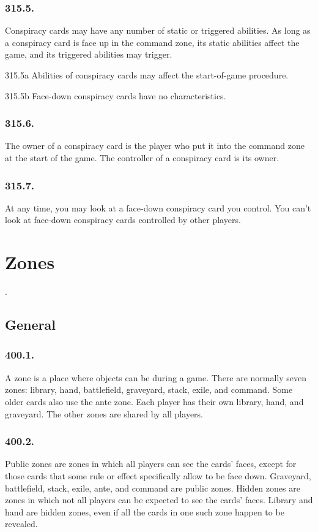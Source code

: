 \subsection*{315.5.}
Conspiracy cards may have any number of static or triggered abilities. As long as a conspiracy card is face up in the command zone, its static abilities affect the game, and its triggered abilities may trigger.

315.5a Abilities of conspiracy cards may affect the start-of-game procedure.

315.5b Face-down conspiracy cards have no characteristics.

\subsection*{315.6.}
The owner of a conspiracy card is the player who put it into the command zone at the start of the game. The controller of a conspiracy card is its owner.

\subsection*{315.7.}
At any time, you may look at a face-down conspiracy card you control. You can’t look at face-down conspiracy cards controlled by other players.

\chapter{Zones}.
\setcounter{section}{399}
\section{General}
\subsection*{400.1.}
A zone is a place where objects can be during a game. There are normally seven zones: library, hand, battlefield, graveyard, stack, exile, and command. Some older cards also use the ante zone. Each player has their own library, hand, and graveyard. The other zones are shared by all players.

\subsection*{400.2.}
Public zones are zones in which all players can see the cards’ faces, except for those cards that some rule or effect specifically allow to be face down. Graveyard, battlefield, stack, exile, ante, and command are public zones. Hidden zones are zones in which not all players can be expected to see the cards’ faces. Library and hand are hidden zones, even if all the cards in one such zone happen to be revealed.

